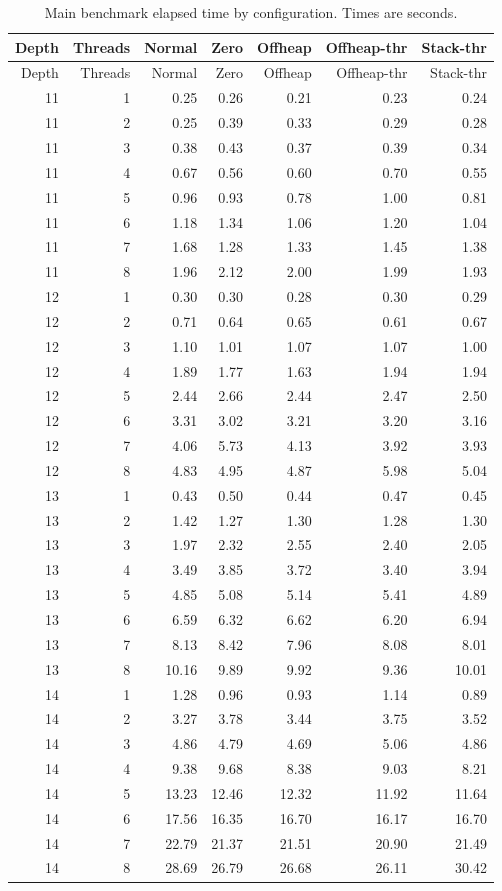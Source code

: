 \documentclass[11pt]{article}
\begin{document}
\begin{longtable}{rrrrrrr}
\caption{Main benchmark elapsed time by configuration. Times are seconds.}
\label{tab:detail}\\
\toprule
Depth & Threads & Normal & Zero & Offheap & Offheap-thr & Stack-thr \\
\midrule
\endfirsthead
\toprule
Depth & Threads & Normal & Zero & Offheap & Offheap-thr & Stack-thr \\
\midrule
\endhead
11 & 1 & 0.25 & 0.26 & 0.21 & 0.23 & 0.24 \\
11 & 2 & 0.25 & 0.39 & 0.33 & 0.29 & 0.28 \\
11 & 3 & 0.38 & 0.43 & 0.37 & 0.39 & 0.34 \\
11 & 4 & 0.67 & 0.56 & 0.60 & 0.70 & 0.55 \\
11 & 5 & 0.96 & 0.93 & 0.78 & 1.00 & 0.81 \\
11 & 6 & 1.18 & 1.34 & 1.06 & 1.20 & 1.04 \\
11 & 7 & 1.68 & 1.28 & 1.33 & 1.45 & 1.38 \\
11 & 8 & 1.96 & 2.12 & 2.00 & 1.99 & 1.93 \\
12 & 1 & 0.30 & 0.30 & 0.28 & 0.30 & 0.29 \\
12 & 2 & 0.71 & 0.64 & 0.65 & 0.61 & 0.67 \\
12 & 3 & 1.10 & 1.01 & 1.07 & 1.07 & 1.00 \\
12 & 4 & 1.89 & 1.77 & 1.63 & 1.94 & 1.94 \\
12 & 5 & 2.44 & 2.66 & 2.44 & 2.47 & 2.50 \\
12 & 6 & 3.31 & 3.02 & 3.21 & 3.20 & 3.16 \\
12 & 7 & 4.06 & 5.73 & 4.13 & 3.92 & 3.93 \\
12 & 8 & 4.83 & 4.95 & 4.87 & 5.98 & 5.04 \\
13 & 1 & 0.43 & 0.50 & 0.44 & 0.47 & 0.45 \\
13 & 2 & 1.42 & 1.27 & 1.30 & 1.28 & 1.30 \\
13 & 3 & 1.97 & 2.32 & 2.55 & 2.40 & 2.05 \\
13 & 4 & 3.49 & 3.85 & 3.72 & 3.40 & 3.94 \\
13 & 5 & 4.85 & 5.08 & 5.14 & 5.41 & 4.89 \\
13 & 6 & 6.59 & 6.32 & 6.62 & 6.20 & 6.94 \\
13 & 7 & 8.13 & 8.42 & 7.96 & 8.08 & 8.01 \\
13 & 8 & 10.16 & 9.89 & 9.92 & 9.36 & 10.01 \\
14 & 1 & 1.28 & 0.96 & 0.93 & 1.14 & 0.89 \\
14 & 2 & 3.27 & 3.78 & 3.44 & 3.75 & 3.52 \\
14 & 3 & 4.86 & 4.79 & 4.69 & 5.06 & 4.86 \\
14 & 4 & 9.38 & 9.68 & 8.38 & 9.03 & 8.21 \\
14 & 5 & 13.23 & 12.46 & 12.32 & 11.92 & 11.64 \\
14 & 6 & 17.56 & 16.35 & 16.70 & 16.17 & 16.70 \\
14 & 7 & 22.79 & 21.37 & 21.51 & 20.90 & 21.49 \\
14 & 8 & 28.69 & 26.79 & 26.68 & 26.11 & 30.42 \\
\bottomrule
\end{longtable}
\end{document}
